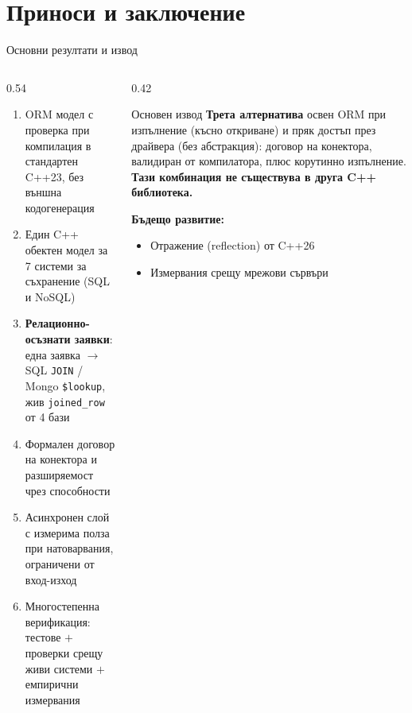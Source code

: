 \documentclass[aspectratio=169,12pt]{beamer}
\begin{document}
\section{Приноси и заключение}

\begin{frame}{Основни резултати и извод}
    \begin{columns}[T]
        \begin{column}{0.54\textwidth}
            \begin{enumerate}\footnotesize
                \setlength{\itemsep}{0.05em}
                \item ORM модел с проверка при компилация в стандартен C++23, без външна кодогенерация
                \item Един C++ обектен модел за 7 системи за съхранение (SQL и NoSQL)
                \item \textbf{Релационно-осъзнати заявки}: една заявка $\rightarrow$ SQL \texttt{JOIN} / Mongo \texttt{\$lookup}, жив \texttt{joined\_row} от 4 бази
                \item Формален договор на конектора и разширяемост чрез способности
                \item Асинхронен слой с измерима полза при натоварвания, ограничени от вход-изход
                \item Многостепенна верификация: тестове $+$ проверки срещу живи системи $+$ емпирични измервания
            \end{enumerate}
        \end{column}
        \begin{column}{0.42\textwidth}
            \begin{block}{Основен извод}
                {\footnotesize \textbf{Трета алтернатива} освен ORM при изпълнение (късно
                откриване) и пряк достъп през драйвера (без абстракция): договор на
                конектора, валидиран от компилатора, плюс корутинно изпълнение.
                \textbf{\color{tusofia}Тази комбинация не съществува в друга C++ библиотека.}}
            \end{block}
            \textbf{Бъдещо развитие:}
            \begin{itemize}\footnotesize
                \setlength{\itemsep}{0.1em}
                \item Отражение (reflection) от C++26
                \item Измервания срещу мрежови сървъри
            \end{itemize}
        \end{column}
    \end{columns}
\end{frame}
\end{document}
